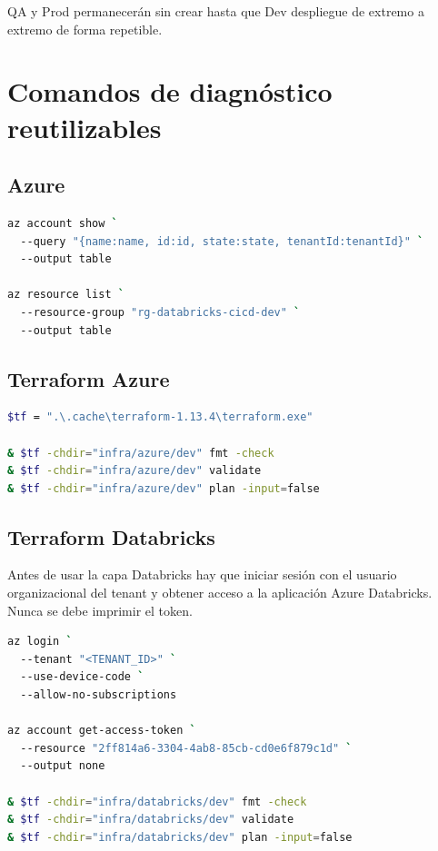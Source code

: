 \documentclass[11pt,a4paper]{article}
\begin{document}
QA y Prod permanecerán sin crear hasta que Dev despliegue de extremo a extremo de forma repetible.

\section{Comandos de diagnóstico reutilizables}

\subsection{Azure}

\begin{lstlisting}[language=bash]
az account show `
  --query "{name:name, id:id, state:state, tenantId:tenantId}" `
  --output table

az resource list `
  --resource-group "rg-databricks-cicd-dev" `
  --output table
\end{lstlisting}

\subsection{Terraform Azure}

\begin{lstlisting}[language=bash]
$tf = ".\.cache\terraform-1.13.4\terraform.exe"

& $tf -chdir="infra/azure/dev" fmt -check
& $tf -chdir="infra/azure/dev" validate
& $tf -chdir="infra/azure/dev" plan -input=false
\end{lstlisting}

\subsection{Terraform Databricks}

Antes de usar la capa Databricks hay que iniciar sesión con el usuario organizacional del tenant y
obtener acceso a la aplicación Azure Databricks. Nunca se debe imprimir el token.

\begin{lstlisting}[language=bash]
az login `
  --tenant "<TENANT_ID>" `
  --use-device-code `
  --allow-no-subscriptions

az account get-access-token `
  --resource "2ff814a6-3304-4ab8-85cb-cd0e6f879c1d" `
  --output none

& $tf -chdir="infra/databricks/dev" fmt -check
& $tf -chdir="infra/databricks/dev" validate
& $tf -chdir="infra/databricks/dev" plan -input=false
\end{lstlisting}
\end{document}
